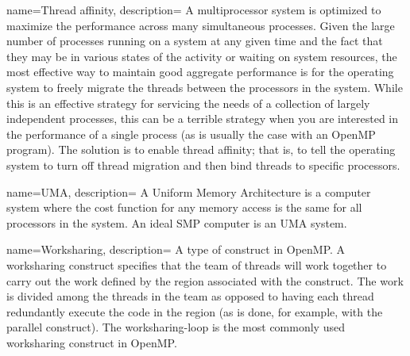 {
   name={Thread affinity},
   description={
   A multiprocessor system is optimized to maximize the performance across many simultaneous processes.
   Given the large number of processes running on a system at any given time and the fact that they may  be
   in various states of the activity or waiting on system resources, the most effective way to maintain good
   aggregate performance is for the operating system to freely migrate the threads between the processors
   in the system.  While this is an effective strategy for servicing the needs of a collection of largely independent
   processes, this can be a terrible strategy when you are interested in the performance of a single process (as
   is usually the case with an OpenMP program).  The solution is to enable thread affinity; that is, to tell the 
   operating system to turn off thread migration and then bind threads to specific processors.      }
}   


{
   name={UMA},
   description={
   A Uniform Memory Architecture is a computer system where the cost function for any memory access is 
   the same for all processors in the system.  An ideal SMP computer is an UMA system.
   }
}   


{
   name={Worksharing},
   description={
   A type of construct in OpenMP.  A worksharing construct specifies that the team of threads will work together
   to carry out the work defined by the region associated with the construct.  The work is divided among the
   threads in the team as opposed to having each thread redundantly execute the code in the region (as is
   done, for example, with the parallel construct).   The worksharing-loop is the
   most commonly used worksharing construct in OpenMP. 
      }
}   




